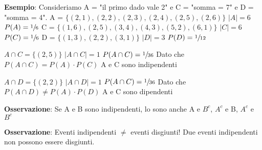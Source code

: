 \begin{tcolorbox}
    \textbf{Esempio}: Consideriamo \newline A = "il primo dado vale 2" e C = "somma = 7" e D = "somma = 4". \newline
    \noindent A = $\{(2,1),(2,2),(2,3),(2,4),(2,5),(2,6)\}$ $|A|=6$ $P(A) = \sfrac{1}{6}$ \newline
    C = $\{(1,6),(2,5),(3,4),(4,3),(5,2),(6,1)\}$ $|C|=6$ $P(C) = \sfrac{1}{6}$ \newline
    D = $\{(1,3),(2,2),(3,1)\}$ $|D| = 3$ $P(D) = \sfrac{1}{12}$ \newline
    
    $ A \cap C = \{(2,5)\}$  $|A \cap C| =1$ $P(A \cap C) = \sfrac{1}{36} $ \newline
    Dato che $P(A \cap C) = P(A) \cdot P(C)$ A e C sono indipendenti \newline
   
    $ A \cap D = \{(2,2)\}$  $|A \cap D| =1$ $P(A \cap C) = \sfrac{1}{36} $ \newline
    Dato che $P(A \cap D) \not= P(A) \cdot P(D)$ A e C sono dipendenti \newline
\end{tcolorbox} 

\noindent \textbf{Osservazione}: Se A e B sono indipendenti, lo sono anche A e $B^c$, $A^c$ e B, $A^c$ e $B^c$

\noindent \textbf{Osservazione}: Eventi indipendenti $\not=$ eventi disgiunti! Due eventi indipendenti non possono essere disgiunti.

\begin{comment}
\begin{tcolorbox}
   \textbf{Esempio}: Siano A,B eventi indipendenti, ossia $P(A \cap B)=P(A) \cdot P(B)$ entrambi con probabilità 12. Qual è la probabilità di $A \cup B? $\newline
    Possiamo calcolare la probabilità dell'unione di due eventi A e B utilizzando la formula delle probabilità totali: $$P(A \cup B) = P(A) + P(B) - P(A \capB)$$ Dato che A e B sono eventi indipendenti, possiamo sostituire P(A $\cap$ B) con P(A) $\cdot$ P(B): $P(A \cup B) = P(A) + P(B) - P(A) \cdot P(B)$. \newline
    Poiché P(A) = P(B) = $\dfrac{1}{2}$, sostituendo nella formula, otteniamo: $$ P(A \cup B) = \dfrac{1}{2} + \dfrac{1}{2} - \dfrac{1}{2} \cdot \dfrac{1}{2} = \dfrac{3}{4} $$
\end{tcolorbox}
\end{comment}

